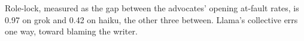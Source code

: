 Role-lock, measured as the gap between the advocates' opening at-fault rates, is 0.97
on grok and 0.42 on haiku, the other three between. Llama's collective errs
one way, toward blaming the writer.
